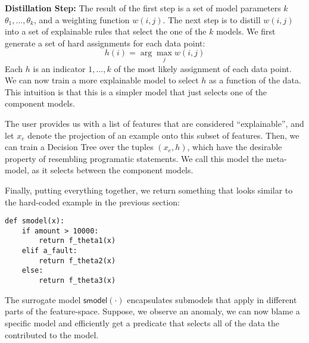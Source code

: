 \vspace{0.5em} \noindent \textbf{Distillation Step: } The result of the first step is a set of model parameters $k$ $\theta_1,...,\theta_k$, and a weighting function $w(i,j)$. The next step is to distill $w(i,j)$ into a set of explainable rules that select the one of the $k$ models. We first generate a set of hard assignments for each data point:
\[
h(i) = \arg\max_{j} w(i,j)
\]
Each $h$ is an indicator $1,...,k$ of the most likely assignment of each data point.
We can now train a more explainable model to select $h$ as a function of the data.
This intuition is that this is a simpler model that just selects one of the component models.

The user provides us with a list of features that are considered ``explainable'', and let $x_e$ denote the projection of an example onto this subset of features.
Then, we can train a Decision Tree over the tuples $(x_e, h)$, which have the desirable property of resembling programatic statements.
We call this model the meta-model, as it selects between the component models.

Finally, putting everything together, we return something that looks similar to the hard-coded example in the previous section:
\begin{lstlisting}
def smodel(x):
    if amount > 10000:
        return f_theta1(x)
    elif a_fault:
        return f_theta2(x)
    else:
        return f_theta3(x)
\end{lstlisting}
The surrogate model $\textsf{smodel}(\cdot)$ encapsulates submodels that apply in different parts of the feature-space.
Suppose, we observe an anomaly, we can now blame a specific model and efficiently get a predicate that selects all of the data the contributed to the model.